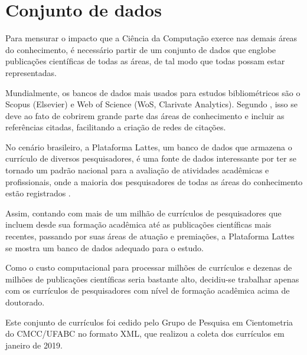 \chapter{Conjunto de dados}

Para mensurar o impacto que a Ciência da Computação exerce nas demais áreas do conhecimento, é necessário partir de um conjunto de dados que englobe publicações científicas de todas as áreas, de tal modo que todas possam estar representadas.

Mundialmente, os bancos de dados mais usados para estudos bibliométricos são o Scopus (Elsevier) e Web of Science (WoS, Clarivate Analytics). Segundo , isso se deve ao fato de cobrirem grande parte das áreas de conhecimento e incluir as referências citadas, facilitando a criação de redes de citações.

No cenário brasileiro, a Plataforma Lattes, um banco de dados que armazena o currículo de diversos pesquisadores, é uma fonte de dados interessante por ter se tornado um padrão nacional para a avaliação de atividades acadêmicas e profissionais, onde a maioria dos pesquisadores de todas as áreas do conhecimento estão registrados \cite{mena2014brazilian}.

Assim, contando com mais de um milhão de currículos de pesquisadores que incluem desde sua formação acadêmica até as publicações científicas mais recentes, passando por suas áreas de atuação e premiações, a Plataforma Lattes se mostra um banco de dados adequado para o estudo.

Como o custo computacional para processar milhões de currículos e dezenas de milhões de publicações científicas seria bastante alto, decidiu-se trabalhar apenas com os currículos de pesquisadores com nível de formação acadêmica acima de doutorado.

Este conjunto de currículos foi cedido pelo Grupo de Pesquisa em Cientometria do CMCC/UFABC no formato XML, que realizou a coleta dos currículos em janeiro de 2019.